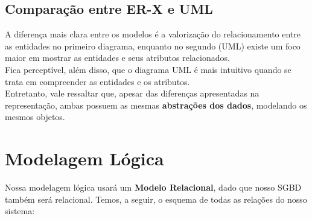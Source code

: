 \documentclass{article}
\begin{document}
	\subsection{Comparação entre ER-X e UML}
	A diferença mais clara entre os modelos é a valorização do relacionamento entre as entidades no primeiro diagrama, enquanto no segundo (UML) existe um foco maior em mostrar as entidades e seus atributos relacionados.\\
	Fica perceptível, além disso, que o diagrama UML é mais intuitivo quando se trata em compreender as entidades e os atributos. \\
	Entretanto, vale ressaltar que, apesar das diferenças apresentadas na representação, ambas possuem as mesmas \textbf{abstrações dos dados}, modelando os mesmos objetos.

\section{Modelagem Lógica}
	Nossa modelagem lógica usará um \textbf{Modelo Relacional}, dado que nosso SGBD também será relacional. Temos, a seguir, o esquema de todas as relações do nosso sistema:\\
\end{document}
